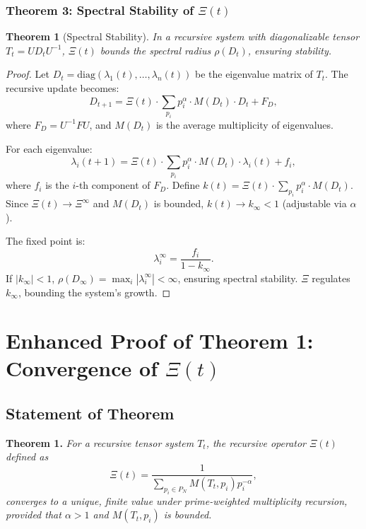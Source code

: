 \documentclass{article}
\theoremstyle{plain}
\newtheorem{theorem}{Theorem}
\begin{document}
\subsubsection{Theorem 3: Spectral Stability of \(\Xi(t)\)}
\begin{theorem}[Spectral Stability]
In a recursive system with diagonalizable tensor \( T_t = U D_t U^{-1} \), \(\Xi(t)\) bounds the spectral radius \(\rho(D_t)\), ensuring stability.
\end{theorem}

\begin{proof}
Let \( D_t = \text{diag}(\lambda_1(t), \ldots, \lambda_n(t)) \) be the eigenvalue matrix of \( T_t \). The recursive update becomes:
\[
D_{t+1} = \Xi(t) \cdot \sum_{p_i} p_i^\alpha \cdot M(D_t) \cdot D_t + F_D,
\]
where \( F_D = U^{-1} F U \), and \( M(D_t) \) is the average multiplicity of eigenvalues.

For each eigenvalue:
\[
\lambda_i(t+1) = \Xi(t) \cdot \sum_{p_i} p_i^\alpha \cdot M(D_t) \cdot \lambda_i(t) + f_i,
\]
where \( f_i \) is the \( i \)-th component of \( F_D \). Define \( k(t) = \Xi(t) \cdot \sum_{p_i} p_i^\alpha \cdot M(D_t) \). Since \( \Xi(t) \to \Xi^\infty \) and \( M(D_t) \) is bounded, \( k(t) \to k_\infty < 1 \) (adjustable via \(\alpha\)).

The fixed point is:
\[
\lambda_i^\infty = \frac{f_i}{1 - k_\infty}.
\]
If \( |k_\infty| < 1 \), \(\rho(D_\infty) = \max_i |\lambda_i^\infty| < \infty\), ensuring spectral stability. \(\Xi\) regulates \( k_\infty \), bounding the system’s growth.
\end{proof}

\section{Enhanced Proof of Theorem 1: Convergence of \(\Xi(t)\)}

\subsection{Statement of Theorem}
\textbf{Theorem 1.} \textit{For a recursive tensor system \( T_t \), the recursive operator \(\Xi(t)\) defined as}
\begin{equation}
    \Xi(t) = \frac{1}{\sum_{p_i \in P_N} M(T_t, p_i) p_i^{-\alpha}},
\end{equation}
\textit{converges to a unique, finite value under prime-weighted multiplicity recursion, provided that \( \alpha > 1 \) and \( M(T_t, p_i) \) is bounded.}
\end{document}
